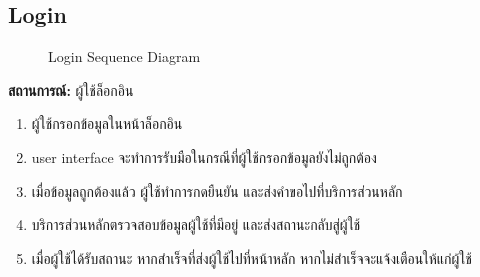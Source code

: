 \subsection{Login}
\begin{figure}[H]\centering
    \setlength{\fboxrule}{0.2mm} %
    \caption{Login Sequence Diagram}\label{fig:loginSeqDiagram}
\end{figure}
\textbf{สถานการณ์: }ผู้ใช้ล็อกอิน
\begin{enumerate}
    \item ผู้ใช้กรอกข้อมูลในหน้าล็อกอิน
    \item user interface จะทำการรับมือในกรณีที่ผู้ใช้กรอกข้อมูลยังไม่ถูกต้อง
    \item เมื่อข้อมูลถูกต้องแล้ว ผู้ใช้ทำการกดยืนยัน และส่งคำขอไปที่บริการส่วนหลัก
    \item บริการส่วนหลักตรวจสอบข้อมูลผู้ใช้ที่มีอยู่ และส่งสถานะกลับสู่ผู้ใช้
    \item เมื่อผู้ใช้ได้รับสถานะ หากสำเร็จที่ส่งผู้ใช้ไปที่หน้าหลัก หากไม่สำเร็จจะแจ้งเตือนให้แก่ผู้ใช้
\end{enumerate}

